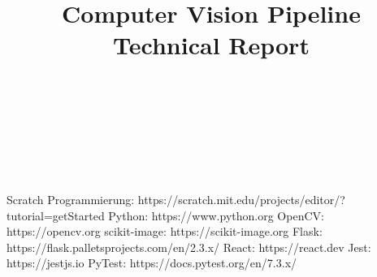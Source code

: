 \documentclass[conference]{IEEEtran}
\begin{document}
\title{\textbf{Computer Vision Pipeline}
	\\Technical Report}

\author{

	\\
	
	\and
	
	\\
	
	\and
	
	\\
	
}


\maketitle



\begin{thebibliography}{00}
	 Scratch Programmierung: https://scratch.mit.edu/projects/editor/?tutorial=getStarted
	 Python: https://www.python.org
	 OpenCV: https://opencv.org
	 scikit-image: https://scikit-image.org
	 Flask: https://flask.palletsprojects.com/en/2.3.x/
	 React: https://react.dev
	 Jest: https://jestjs.io
	 PyTest: https://docs.pytest.org/en/7.3.x/
\end{thebibliography}
\vspace{12pt}
\end{document}

